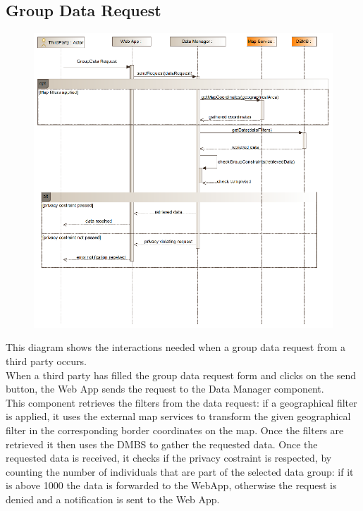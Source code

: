 \subsection{Group Data Request}
\begin{figure}[H]
\centering
\includegraphics[width=\linewidth]{resources/uml/sequence/RequestGroupData.png}
\end{figure}
This diagram shows the interactions needed when a group data request from a third party occurs.\\
When a third party has filled the group data request form and clicks on the send button, the Web App sends the request to the Data Manager component.\\
This component retrieves the filters from the data request: if a geographical filter is applied, it uses the external map services to transform the given geographical filter in the corresponding border coordinates on the map.
Once the filters are retrieved it then uses the DMBS to gather the requested data.
Once the requested data is received, it checks if the privacy costraint is respected, by counting the number of individuals that are part of the selected data group: if it is above 1000 the data is forwarded to the WebApp, otherwise the request is denied and a notification is sent to the Web App.

